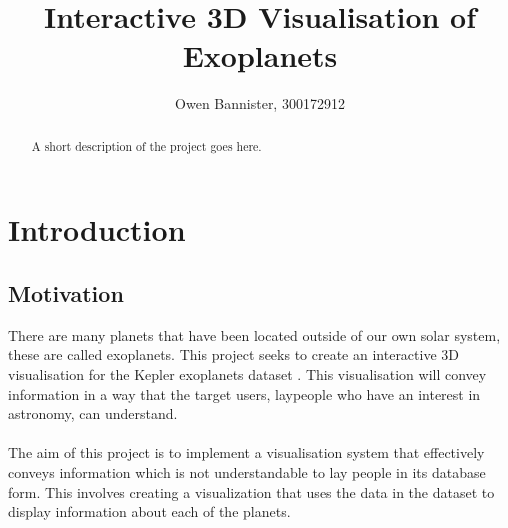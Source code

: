 \documentclass[11pt
              , a4paper
              , twoside
              , openright
              ]{report}
\title{Interactive 3D Visualisation of Exoplanets}
\author{Owen Bannister, 300172912}
\date{}
\begin{document}
\frontmatter



\begin{abstract}

A short description of the project goes here.

\end{abstract}


\maketitle


\tableofcontents



\mainmatter


\chapter{Introduction}
\section{Motivation}
There are many planets that have been located outside of our own solar system, these are called exoplanets. This project seeks to create an interactive 3D visualisation for the Kepler exoplanets dataset \cite{dataset}.  This visualisation will convey information in a way that the target users, laypeople who have an interest in astronomy, can understand.
\\\\
The aim of this project is to implement a visualisation system that effectively conveys information which is not understandable to lay people in its database form. This involves creating a visualization that uses the data in the dataset to display information about each of the planets.
\end{document}
